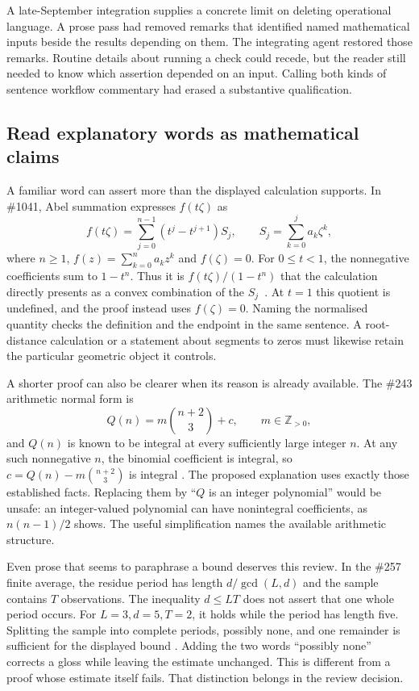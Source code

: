 A late-September integration supplies a concrete limit on deleting operational
language. A prose pass had removed remarks that identified named mathematical
inputs beside the results depending on them. The integrating agent restored
those remarks. Routine details about running a check could recede, but the
reader still needed to know which assertion depended on an input. Calling
both kinds of sentence workflow commentary had erased a substantive
qualification.

\subsection{Read explanatory words as mathematical claims}\label{sec:words-as-claims}

A familiar word can assert more than the displayed calculation supports. In
\#1041, Abel summation expresses $f(t\zeta)$ as
\[
 f(t\zeta)=\sum_{j=0}^{n-1}(t^j-t^{j+1})S_j,
 \qquad S_j=\sum_{k=0}^{j}a_k\zeta^k,
\]
where $n\ge1$, $f(z)=\sum_{k=0}^n a_kz^k$ and $f(\zeta)=0$.
For $0\le t<1$, the nonnegative coefficients sum to $1-t^n$.
Thus it is $f(t\zeta)/(1-t^n)$ that the calculation directly presents as a
convex combination of the $S_j$~\cite[section on trinomials]{paper1041}.
At $t=1$ this quotient is undefined, and the proof instead uses $f(\zeta)=0$.
Naming the normalised quantity checks the definition and the endpoint in the
same sentence. A root-distance calculation or a statement about segments to
zeros must likewise retain the particular geometric object it controls.

A shorter proof can also be clearer when its reason is already available.
The \#243 arithmetic normal form is
\[
                 Q(n)=m\binom{n+2}{3}+c,
                 \qquad m\in\mathbb Z_{>0},
\]
and $Q(n)$ is known to be integral at every sufficiently large integer $n$.
At any such nonnegative $n$, the binomial coefficient is integral, so
$c=Q(n)-m\binom{n+2}{3}$ is integral
\cite[reduction and the constant term]{paper243}.
The proposed explanation uses exactly those established facts. Replacing them
by ``$Q$ is an integer polynomial'' would be unsafe: an integer-valued polynomial
can have nonintegral coefficients, as $n(n-1)/2$ shows. The useful simplification
names the available arithmetic structure.

Even prose that seems to paraphrase a bound deserves this review. In the
\#257 finite average, the residue period has length $d/\gcd(L,d)$ and the
sample contains $T$ observations. The inequality $d\le LT$ does not assert
that one whole period occurs. For $L=3,d=5,T=2$, it holds while the period
has length five. Splitting the sample into complete periods, possibly none,
and one remainder is sufficient for the displayed bound
\cite[finite means for shifted divisor tails]{paper257}.
Adding the two words ``possibly none'' corrects a gloss while leaving the
estimate unchanged. This is different from a proof whose estimate itself
fails. That distinction belongs in the review decision.


